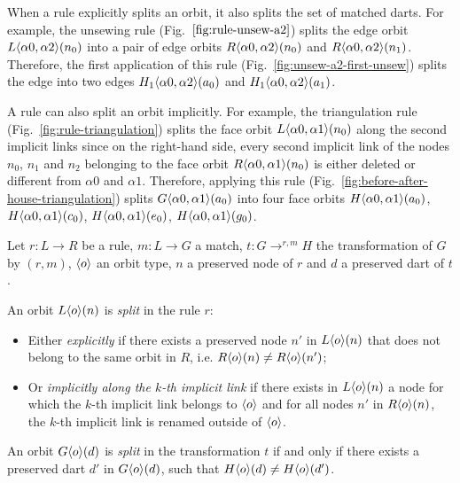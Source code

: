 When a rule explicitly splits an orbit, it also splits the set of matched darts.
For example, the unsewing rule (Fig.~$\ref{fig:rule-unsew-a2}$) splits the edge orbit $L\langle\alpha 0, \alpha 2\rangle(n_{0})$ into a pair of edge orbits $R\langle\alpha 0, \alpha 2\rangle(n_{0})$ and $R\langle\alpha 0, \alpha 2\rangle(n_{1})$.
Therefore, the first application of this rule (Fig.~\ref{fig:unsew-a2-first-unsew}) splits the edge into two edges $H_1\langle\alpha 0, \alpha 2\rangle(a_{0})$ and $H_1\langle\alpha 0, \alpha 2\rangle(a_{1})$.

A rule can also split an orbit implicitly.
For example, the triangulation rule (Fig.~\ref{fig:rule-triangulation}) splits the face orbit $L\langle\alpha 0, \alpha 1\rangle(n_{0})$ along the second implicit links since on the right-hand side, every second implicit link of the nodes  $n_{0}$, $n_{1}$ and $n_{2}$ belonging to the face orbit $R\langle\alpha 0, \alpha 1\rangle(n_{0})$ is either deleted or different from $\alpha 0$ and $\alpha 1$.
Therefore, applying this rule (Fig.~\ref{fig:before-after-house-triangulation})
splits $G\langle\alpha 0, \alpha 1\rangle(a_{0})$ into four face orbits $H\langle\alpha 0, \alpha 1\rangle(a_{0})$,
$H\langle\alpha 0, \alpha 1\rangle(c_{0})$, $H\langle\alpha 0, \alpha 1\rangle(e_{0})$,
$H\langle\alpha 0, \alpha 1\rangle(g_{0})$.


\begin{definition}\label{def:orbit-split}
  Let $r: L \longrightarrow R$ be a rule, $m: L \to G$ a match,
  $t: G \longrightarrow^{r,m}H$ the transformation of $G$ by $(r,m)$, $\langle o\rangle$
  an orbit type, $n$ a preserved node of $r$ and $d$ a preserved dart of $t$.

  An orbit $L\langle o\rangle(n)$ is \emph{split} in the rule $r$:
 \begin{itemize}
    \item Either \emph{explicitly} if there exists a preserved node $n'$ in $L\langle o\rangle(n)$ that does not belong to the same orbit in $R$, i.e. $R\langle o\rangle(n) \neq R\langle o\rangle(n')$;

    \item Or \emph{implicitly along the $k$-th implicit link} if there exists in $L\langle o\rangle(n)$ a node for which the $k$-th implicit link
          belongs to $\langle o\rangle$ and for all nodes $n'$ in $R\langle o\rangle(n)$, the $k$-th implicit link is
          renamed outside of $\langle o\rangle$.
   \end{itemize}

        An orbit $G\langle o\rangle(d)$ is \emph{split} in the transformation $t$ if
        and only if there exists a preserved dart $d'$ in $G\langle o\rangle(d)$,
        such that $H\langle o\rangle(d) \neq H\langle o\rangle(d')$.
\end{definition}

